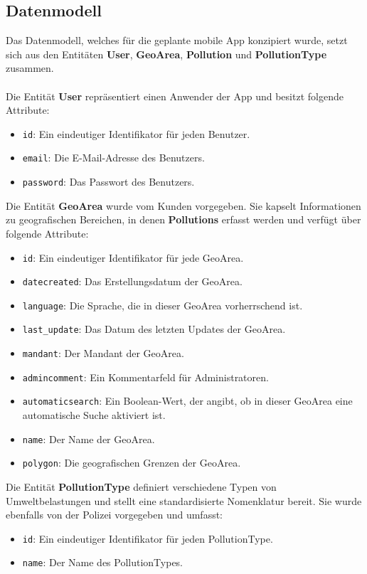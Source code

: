 \documentclass[a4paper,12pt]{article}
\begin{document}
\subsection{Datenmodell}
Das Datenmodell, welches für die geplante mobile App konzipiert wurde, setzt sich aus den Entitäten \textbf{User}, \textbf{GeoArea}, \textbf{Pollution} und \textbf{PollutionType} zusammen.\\
\\
Die Entität \textbf{User} repräsentiert einen Anwender der App und besitzt folgende Attribute:
\begin{itemize}
    \item \texttt{id}: Ein eindeutiger Identifikator für jeden Benutzer.
    \item \texttt{email}: Die E-Mail-Adresse des Benutzers.
    \item \texttt{password}: Das Passwort des Benutzers.
\end{itemize}
Die Entität \textbf{GeoArea} wurde vom Kunden vorgegeben. Sie kapselt Informationen zu geografischen Bereichen, in denen \textbf{Pollutions} erfasst werden und verfügt über folgende Attribute:
\begin{itemize}
    \item \texttt{id}: Ein eindeutiger Identifikator für jede GeoArea.
    \item \texttt{datecreated}: Das Erstellungsdatum der GeoArea.
    \item \texttt{language}: Die Sprache, die in dieser GeoArea vorherrschend ist.
    \item \texttt{last\_update}: Das Datum des letzten Updates der GeoArea.
    \item \texttt{mandant}: Der Mandant der GeoArea.
    \item \texttt{admincomment}: Ein Kommentarfeld für Administratoren.
    \item \texttt{automaticsearch}: Ein Boolean-Wert, der angibt, ob in dieser GeoArea eine automatische Suche aktiviert ist.
    \item \texttt{name}: Der Name der GeoArea.
    \item \texttt{polygon}: Die geografischen Grenzen der GeoArea.
\end{itemize}
Die Entität \textbf{PollutionType} definiert verschiedene Typen von Umweltbelastungen und stellt eine standardisierte Nomenklatur bereit. Sie wurde ebenfalls von der Polizei vorgegeben und umfasst:
\begin{itemize}
    \item \texttt{id}: Ein eindeutiger Identifikator für jeden PollutionType.
    \item \texttt{name}: Der Name des PollutionTypes.
\end{itemize}
\end{document}
